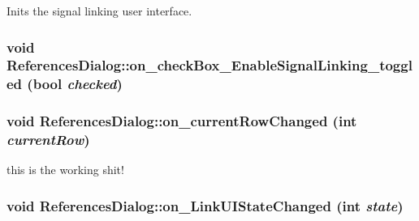 Inits the signal linking user interface. 

\hypertarget{class_references_dialog_b83aae9c0988a30af4f832fc82acb626}{
\subsubsection[{on\_\-checkBox\_\-EnableSignalLinking\_\-toggled}]{\setlength{\rightskip}{0pt plus 5cm}void ReferencesDialog::on\_\-checkBox\_\-EnableSignalLinking\_\-toggled (bool {\em checked})}}
\label{class_references_dialog_b83aae9c0988a30af4f832fc82acb626}


\hypertarget{class_references_dialog_8b163293d7e60e642a9ccd55ba0d5a8b}{
\subsubsection[{on\_\-currentRowChanged}]{\setlength{\rightskip}{0pt plus 5cm}void ReferencesDialog::on\_\-currentRowChanged (int {\em currentRow})}}
\label{class_references_dialog_8b163293d7e60e642a9ccd55ba0d5a8b}


this is the working shit! 

\hypertarget{class_references_dialog_e5e604ebe9d640fc8dce542ff6dbc8a4}{
\subsubsection[{on\_\-LinkUIStateChanged}]{\setlength{\rightskip}{0pt plus 5cm}void ReferencesDialog::on\_\-LinkUIStateChanged (int {\em state})}}
\label{class_references_dialog_e5e604ebe9d640fc8dce542ff6dbc8a4}


